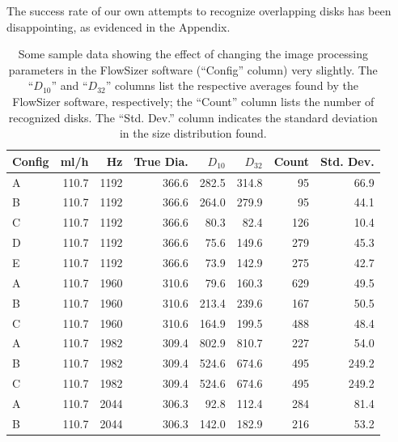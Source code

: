 \documentclass[11.5pt,oneside]{book}
\begin{document}
The success rate of our own attempts to recognize overlapping disks has been
disappointing, as evidenced in the Appendix.

\begin{table}
        \centering
        \begin{tabular}{ l r r r r r r r }
                \toprule
                Config&	ml/h &	Hz	&  True Dia. &	$D_{10}$ &	$D_{32}$ &	Count & Std. Dev. \\
                \midrule
A&   	110.7&	1192&	366.6&       	282.5	&    314.8&	95  &	66.9 \\
B&   	110.7&	1192&	366.6&       	264.0     &    279.9&	95  &	44.1 \\
C&   	110.7&	1192&	366.6&       	80.3	&    82.4 &  126& 	10.4 \\
D&   	110.7&	1192&	366.6&       	75.6	&    149.6&	279 &	45.3 \\
E&   	110.7&	1192&	366.6&       	73.9	&    142.9&	275 &	42.7 \\
A&   	110.7&	1960&	310.6&       	79.6	&    160.3&	629 &	49.5 \\
B&   	110.7&	1960&	310.6&       	213.4	&    239.6&	167 &	50.5 \\
C&   	110.7&	1960&	310.6&       	164.9	&    199.5&	488 &	48.4 \\
A&   	110.7&	1982&	309.4&       	802.9	&    810.7&	227 &	54.0   \\
B&   	110.7&	1982&	309.4&       	524.6	&    674.6&	495 &	249.2\\
C&   	110.7&	1982&	309.4&       	524.6	&    674.6&	495 &	249.2\\
A&   	110.7&	2044&	306.3&       	92.8	&    112.4&	284 &	81.4 \\
B&   	110.7&	2044&	306.3&       	142.0 	&    182.9&	216 &	53.2 \\
                \bottomrule
        \end{tabular}
        \caption{Some sample data showing the effect of changing the image
                processing parameters in the FlowSizer software (``Config''
                column) very slightly. The ``$D_{10}$'' and ``$D_{32}$'' columns list
                the respective averages found by the FlowSizer software,
                respectively; the ``Count'' column lists the number of
                recognized disks. The ``Std. Dev.'' column indicates the
                standard deviation in the size distribution
        found.\label{tab:flowsizererrors}}
\end{table}
\end{document}

